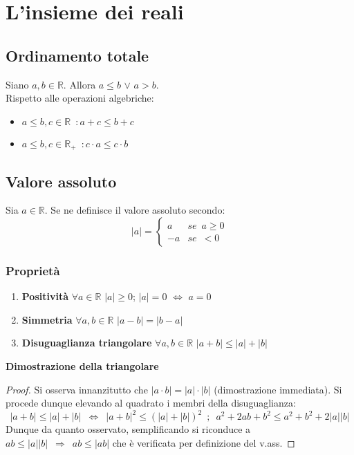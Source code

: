 \documentclass[10pt]{article}
\theoremstyle{plain}
\begin{document}
\section{L'insieme dei reali}
\subsection{Ordinamento totale}
\begin{prop}
    Siano $a, b \in \mathbb{R}$. Allora $a \leq b$ $\lor$ $a > b$.
    \\Rispetto alle operazioni algebriche:
    \begin{itemize}[label = $\square$]
        \item $a \leq b, c \in \mathbb{R} \enspace : a + c \leq b + c$
        \item $a \leq b, c \in \mathbb{R}_+ \enspace : c \cdot a \leq c \cdot b$
    \end{itemize}
\end{prop}

\subsection{Valore assoluto}
\begin{defin}
    Sia $a \in \mathbb{R}$. Se ne definisce il valore assoluto secondo:
    \[|a| = \begin{cases}
        a & se \enspace a \geq 0\\
        -a & se \enspace < 0 
    \end{cases}\]
\end{defin}
\subsubsection*{Proprietà}
\begin{enumerate}
    \item \textbf{Positività} $\forall a \in \mathbb{R}$ $|a| \geq 0$; $|a| = 0$ $\Leftrightarrow$ $a = 0$
    \item \textbf{Simmetria} $\forall a,b \in \mathbb{R}$ $|a - b| = |b - a|$
    \item \textbf{Disuguaglianza triangolare} $\forall a,b \in \mathbb{R}$ $|a+b| \leq |a| + |b|$
\end{enumerate}
\textbf{Dimostrazione della triangolare}
\begin{proof}
    Si osserva innanzitutto che $|a \cdot b| = |a| \cdot |b|$ (dimostrazione immediata). Si procede dunque elevando al quadrato i membri della disuguaglianza:
    \[|a+b| \leq |a| + |b| \enspace \Leftrightarrow \enspace |a + b|^2 \leq (|a| + |b|)^2 \enspace ; \enspace a^2 +2ab + b^2 \leq a^2 + b^2 + 2 |a| |b|\]
    Dunque da quanto osservato, semplificando si riconduce a $ab \leq |a||b| \enspace \Rightarrow \enspace ab \leq |ab|$ che è verificata per definizione del v.ass.
\end{proof}
\end{document}
